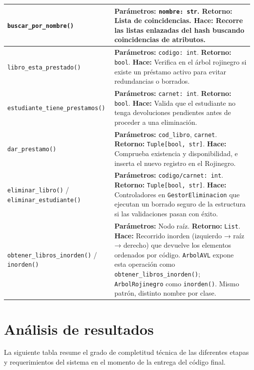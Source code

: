 \documentclass[11pt]{article}
\begin{document}
\begin{longtable}{p{} p{}}
\midrule
\texttt{buscar\_por\_nombre()} & \textbf{Parámetros:} \texttt{nombre: str}. \textbf{Retorno:} Lista de coincidencias. \textbf{Hace:} Recorre las listas enlazadas del hash buscando coincidencias de atributos. \\
\midrule
\texttt{libro\_esta\_prestado()} & \textbf{Parámetros:} \texttt{codigo: int}. \textbf{Retorno:} \texttt{bool}. \textbf{Hace:} Verifica en el árbol rojinegro si existe un préstamo activo para evitar redundancias o borrados. \\
\midrule
\texttt{estudiante\_tiene\_prestamos()} & \textbf{Parámetros:} \texttt{carnet: int}. \textbf{Retorno:} \texttt{bool}. \textbf{Hace:} Valida que el estudiante no tenga devoluciones pendientes antes de proceder a una eliminación. \\
\midrule
\texttt{dar\_prestamo()} & \textbf{Parámetros:} \texttt{cod\_libro}, \texttt{carnet}. \textbf{Retorno:} \texttt{Tuple[bool, str]}. \textbf{Hace:} Comprueba existencia y disponibilidad, e inserta el nuevo registro en el Rojinegro. \\
\midrule
\texttt{eliminar\_libro()} / \texttt{eliminar\_estudiante()} & \textbf{Parámetros:} \texttt{codigo/carnet: int}. \textbf{Retorno:} \texttt{Tuple[bool, str]}. \textbf{Hace:} Controladores en \texttt{GestorEliminacion} que ejecutan un borrado seguro de la estructura si las validaciones pasan con éxito. \\
\midrule
\texttt{obtener\_libros\_inorden()} / \texttt{inorden()} & \textbf{Parámetros:} Nodo raíz. \textbf{Retorno:} \texttt{List}. \textbf{Hace:} Recorrido inorden (izquierdo → raíz → derecho) que devuelve los elementos ordenados por código. \texttt{ArbolAVL} expone esta operación como \texttt{obtener\_libros\_inorden()}; \texttt{ArbolRojinegro} como \texttt{inorden()}. Mismo patrón, distinto nombre por clase. \\
\bottomrule
\end{longtable}

\section{Análisis de resultados}

La siguiente tabla resume el grado de completitud técnica de las diferentes etapas y requerimientos del sistema en el momento de la entrega del código final.
\end{document}
